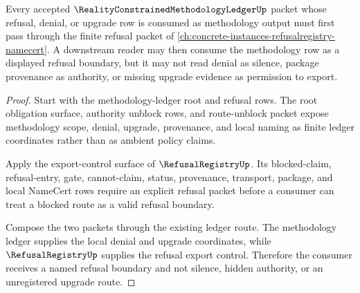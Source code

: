 \begin{theorem}
\label{thm:reality-constrained-methodology-ledger-refusal-registry-dependency}
Every accepted $\RealityConstrainedMethodologyLedgerUp$ packet whose refusal, denial, or upgrade row is consumed as methodology output must first pass through the finite refusal packet of \autoref{ch:concrete-instances-refusalregistry-namecert}. A downstream reader may then consume the methodology row as a displayed refusal boundary, but it may not read denial as silence, package provenance as authority, or missing upgrade evidence as permission to export.
\end{theorem}
\begin{proof}
Start with the methodology-ledger root and refusal rows. The root obligation surface, authority unblock rows, and route-unblock packet expose methodology scope, denial, upgrade, provenance, and local naming as finite ledger coordinates rather than as ambient policy claims.

Apply the export-control surface of $\RefusalRegistryUp$. Its blocked-claim, refusal-entry, gate, cannot-claim, status, provenance, transport, package, and local NameCert rows require an explicit refusal packet before a consumer can treat a blocked route as a valid refusal boundary.

Compose the two packets through the existing ledger route. The methodology ledger supplies the local denial and upgrade coordinates, while $\RefusalRegistryUp$ supplies the refusal export control. Therefore the consumer receives a named refusal boundary and not silence, hidden authority, or an unregistered upgrade route.
\end{proof}
